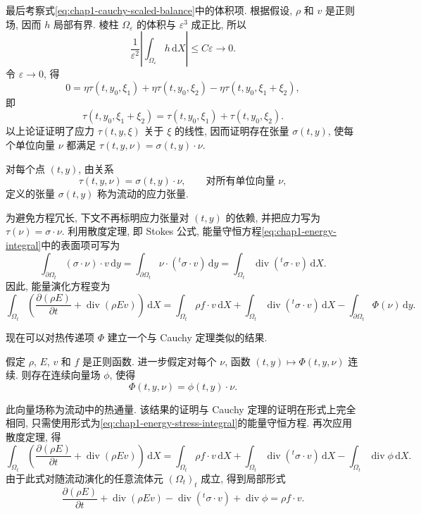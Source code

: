 \begin{Proof}
最后考察式\eqref{eq:chap1-cauchy-scaled-balance}中的体积项. 根据假设, $\rho$ 和 $v$ 是正则场, 因而 $h$ 局部有界. 棱柱 $\Omega_\varepsilon$ 的体积与 $\varepsilon^3$ 成正比, 所以
\[
  \frac1{\varepsilon^2}\left|\int_{\Omega_\varepsilon}h\,\mathrm{d}X\right|
  \leq C\varepsilon\longrightarrow0.
\]
令 $\varepsilon\to0$, 得
\[
  0=\eta\tau(t,y_0,\xi_1)+\eta\tau(t,y_0,\xi_2)-\eta\tau(t,y_0,\xi_1+\xi_2),
\]
即
\[
  \tau(t,y_0,\xi_1+\xi_2)=\tau(t,y_0,\xi_1)+\tau(t,y_0,\xi_2).
\]
以上论证证明了应力 $\tau(t,y,\xi)$ 关于 $\xi$ 的线性, 因而证明存在张量 $\sigma(t,y)$, 使每个单位向量 $\nu$ 都满足 $\tau(t,y,\nu)=\sigma(t,y)\cdot\nu$.
\end{Proof}

\begin{Definition}
\label{def:chap1-stress-tensor}
对每个点 $(t,y)$, 由关系
\[
  \tau(t,y,\nu)=\sigma(t,y)\cdot\nu,\qquad\text{对所有单位向量 $\nu$},
\]
定义的张量 $\sigma(t,y)$ 称为流动的应力张量.
\end{Definition}

为避免方程冗长, 下文不再标明应力张量对 $(t,y)$ 的依赖, 并把应力写为 $\tau(\nu)=\sigma\cdot\nu$. 利用散度定理, 即 Stokes 公式, 能量守恒方程\eqref{eq:chap1-energy-integral}中的表面项可写为
\[
  \int_{\partial\Omega_t}(\sigma\cdot\nu)\cdot v\,\mathrm{d}y
  =\int_{\partial\Omega_t}\nu\cdot({}^{t}\!\sigma\cdot v)\,\mathrm{d}y
  =\int_{\Omega_t}\operatorname{div}({}^{t}\!\sigma\cdot v)\,\mathrm{d}X.
\]
因此, 能量演化方程变为
\begin{equation}
\label{eq:chap1-energy-stress-integral}
\int_{\Omega_t}\left(\frac{\partial(\rho E)}{\partial t}+\operatorname{div}(\rho E v)\right)\,\mathrm{d}X
=\int_{\Omega_t}\rho f\cdot v\,\mathrm{d}X
+\int_{\Omega_t}\operatorname{div}({}^{t}\!\sigma\cdot v)\,\mathrm{d}X
-\int_{\partial\Omega_t}\Phi(\nu)\,\mathrm{d}y.
\end{equation}

现在可以对热传递项 $\Phi$ 建立一个与 Cauchy 定理类似的结果.

\begin{Theorem}
\label{thm:chap1-heat-flux}
假定 $\rho$, $E$, $v$ 和 $f$ 是正则函数. 进一步假定对每个 $\nu$, 函数 $(t,y)\mapsto\Phi(t,y,\nu)$ 连续. 则存在连续向量场 $\phi$, 使得
\[
  \Phi(t,y,\nu)=\phi(t,y)\cdot\nu.
\]
\end{Theorem}

此向量场称为流动中的热通量. 该结果的证明与 Cauchy 定理的证明在形式上完全相同, 只需使用形式为\eqref{eq:chap1-energy-stress-integral}的能量守恒方程. 再次应用散度定理, 得
\[
\int_{\Omega_t}\left(\frac{\partial(\rho E)}{\partial t}+\operatorname{div}(\rho E v)\right)\,\mathrm{d}X
=\int_{\Omega_t}\rho f\cdot v\,\mathrm{d}X
+\int_{\Omega_t}\operatorname{div}({}^{t}\!\sigma\cdot v)\,\mathrm{d}X
-\int_{\Omega_t}\operatorname{div}\phi\,\mathrm{d}X.
\]
由于此式对随流动演化的任意流体元 $(\Omega_t)_t$ 成立, 得到局部形式
\begin{equation}
\label{eq:chap1-energy-local}
  \frac{\partial(\rho E)}{\partial t}+\operatorname{div}(\rho E v)
  -\operatorname{div}({}^{t}\!\sigma\cdot v)+\operatorname{div}\phi=\rho f\cdot v.
\end{equation}

